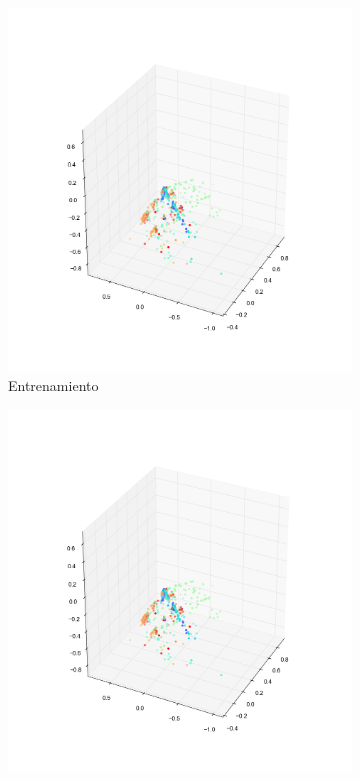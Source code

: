 \begin{figure}[H]
        \begin{subfigure}[b]{0.5\textwidth}
                \includegraphics[width=\linewidth]{secciones/graficos/sanger/1_train.png}
                \caption{Entrenamiento}
                \label{fig: ej1_sanger_3d_1_train}
        \end{subfigure}%
        \begin{subfigure}[b]{0.5\textwidth}
                \includegraphics[width=\linewidth]{secciones/graficos/sanger/1_train.png}

\end{subfigure}
\end{figure}

